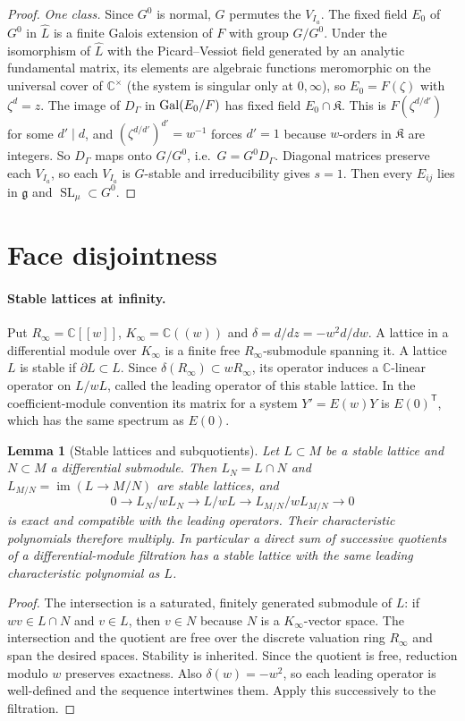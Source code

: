 \documentclass[11pt]{article}
\numberwithin{equation}{section}
\newtheorem{lemma}[theorem]{Lemma}
\theoremstyle{definition}
\theoremstyle{remark}
\newcommand{\C}{\mathbb C}\newcommand{\Q}{\mathbb Q}\newcommand{\R}{\mathbb R}\newcommand{\Z}{\mathbb Z}
\newcommand{\SL}{\operatorname{SL}}\newcommand{\GL}{\operatorname{GL}}\newcommand{\PGL}{\operatorname{PGL}}
\begin{document}
\begin{proof}
\emph{One class.} Since $G^0$ is normal, $G$ permutes the $V_{I_a}$. The fixed
field $E_0$ of $G^0$ in $\widehat L$ is a finite Galois extension of $F$ with
group $G/G^0$. Under the isomorphism of $\widehat L$ with the Picard--Vessiot
field generated by an analytic fundamental matrix, its elements are algebraic
functions meromorphic on the universal cover of $\C^\times$ (the system is
singular only at $0,\infty$), so $E_0=F(\zeta)$ with $\zeta^d=z$. The image of
$D_\Gamma$ in $\operatorname{Gal}(E_0/F)$ has fixed field $E_0\cap\mathfrak K$. This is
$F(\zeta^{d/d'})$ for some $d'\mid d$, and
$(\zeta^{d/d'})^{d'}=w^{-1}$ forces $d'=1$ because $w$-orders in $\mathfrak K$
are integers. So $D_\Gamma$ maps onto $G/G^0$, i.e.\ $G=G^0D_\Gamma$. Diagonal
matrices preserve each $V_{I_a}$, so each $V_{I_a}$ is $G$-stable and
irreducibility gives $s=1$. Then every $E_{ij}$ lies in $\mathfrak g$ and
$\SL_\mu\subset G^0$.
\end{proof}

\section{Face disjointness}

\paragraph{Stable lattices at infinity.}
Put $R_\infty=\C[[w]]$, $K_\infty=\C((w))$ and
$\delta=d/dz=-w^2d/dw$. A lattice in a differential module over $K_\infty$
is a finite free $R_\infty$-submodule spanning it. A lattice $L$ is stable if
$\partial L\subset L$. Since $\delta(R_\infty)\subset wR_\infty$, its
operator induces a $\C$-linear operator on $L/wL$, called the leading
operator of this stable lattice. In the coefficient-module convention its
matrix for a system $Y'=E(w)Y$ is $E(0)^{\mathsf T}$, which has the same
spectrum as $E(0)$.

\begin{lemma}[Stable lattices and subquotients]\label{lem:lattice}
Let $L\subset M$ be a stable lattice and $N\subset M$ a differential
submodule. Then $L_N=L\cap N$ and $L_{M/N}=\operatorname{im}(L\to M/N)$
are stable lattices, and
\[
 0\longrightarrow L_N/wL_N\longrightarrow L/wL
 \longrightarrow L_{M/N}/wL_{M/N}\longrightarrow0
\]
is exact and compatible with the leading operators. Their characteristic
polynomials therefore multiply. In particular a direct sum of successive
quotients of a differential-module filtration has a stable lattice with the
same leading characteristic polynomial as $L$.
\end{lemma}
\begin{proof}
The intersection is a saturated, finitely generated submodule of $L$:
if $wv\in L\cap N$ and $v\in L$, then $v\in N$ because $N$ is a
$K_\infty$-vector space. The intersection and the quotient are free over the
discrete valuation ring $R_\infty$ and span the desired spaces. Stability
is inherited. Since the quotient is free, reduction modulo $w$ preserves
exactness. Also $\delta(w)=-w^2$, so each leading operator is well-defined
and the sequence intertwines them. Apply this successively to the filtration.
\end{proof}
\end{document}
